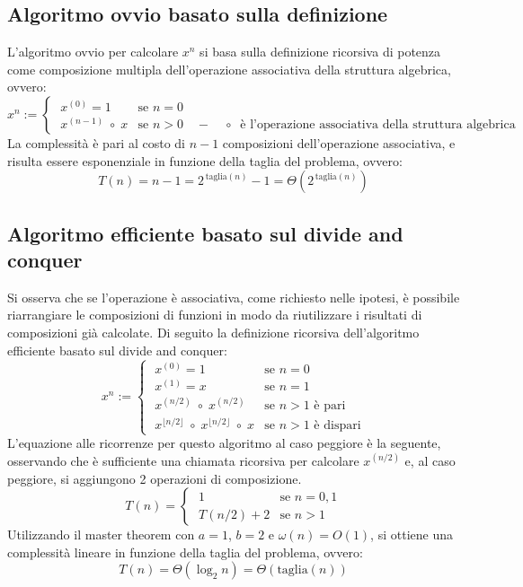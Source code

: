 \subsection{Algoritmo ovvio basato sulla definizione}
L'algoritmo ovvio per calcolare \(x^n\) si basa sulla definizione ricorsiva di potenza come composizione multipla
dell'operazione associativa della struttura algebrica, ovvero:
\[x^n := \begin{cases}
	\; x^{(0)} = 1 & \text{se } n = 0 \\[3pt]
	\; x^{(n-1)} \; \circ \; x & \text{se } n > 0 \quad - \quad \circ \;\; \text{è l'operazione associativa della struttura algebrica}
\end{cases}\]
La complessità è pari al costo di \(n - 1\) composizioni dell'operazione associativa, e risulta essere esponenziale in
funzione della taglia del problema, ovvero:
\[T(n) = n - 1 = 2^{\, \text{taglia}(n)} - 1 = \Theta \left( 2^{\, \text{taglia}(n)} \right)\]

\subsection{Algoritmo efficiente basato sul divide and conquer}
Si osserva che se l'operazione è associativa, come richiesto nelle ipotesi, è possibile riarrangiare le composizioni
di funzioni in modo da riutilizzare i risultati di composizioni già calcolate. Di seguito la definizione ricorsiva
dell'algoritmo efficiente basato sul divide and conquer:
\[x^n := \begin{cases}
	\; x^{(0)} = 1 & \text{se } n = 0 \\[3pt]
	\; x^{(1)} = x & \text{se } n = 1 \\[3pt]
	\; x^{(n/2)} \; \circ \; x^{(n/2)} & \text{se } n > 1 \text{ è pari} \\[3pt]
	\; x^{\lfloor n/2 \rfloor} \; \circ \; x^{\lfloor n/2 \rfloor} \; \circ \; x & \text{se } n > 1 \text{ è dispari}
\end{cases}\]
L'equazione alle ricorrenze per questo algoritmo al caso peggiore è la seguente, osservando che è sufficiente una chiamata
ricorsiva per calcolare \(x^{(n/2)}\) e, al caso peggiore, si aggiungono 2 operazioni di composizione.
\[T(n) = \begin{cases}
	\; 1 & \text{se } n = 0, 1 \\[3pt]
	\; T(n/2) + 2 & \text{se } n > 1
\end{cases}\]
Utilizzando il master theorem con \(a = 1\), \(b = 2\) e \(\omega(n) = O(1)\), si ottiene una complessità lineare
in funzione della taglia del problema, ovvero:
\[T(n) = \Theta \left( \log_2 n \right) = \Theta \left( \text{taglia}(n) \right)\]
